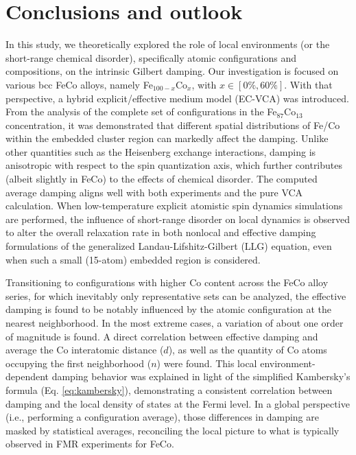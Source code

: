 \section{Conclusions and outlook}
\label{sec:conclusion}

In this study, we theoretically explored the role of local environments (or the short-range chemical disorder), specifically atomic configurations and compositions, on the intrinsic Gilbert damping. Our investigation is focused on various bcc FeCo alloys, namely Fe$_{100-x}$Co$_{x}$, with $x\in[0\%,60\%]$. With that perspective, a hybrid explicit/effective medium model (EC-VCA) was introduced. 
From the analysis of the complete set of configurations in the Fe$_{87}$Co$_{13}$ concentration, it was demonstrated that different spatial distributions of Fe/Co within the embedded cluster region can markedly affect the damping. Unlike other quantities such as the Heisenberg exchange interactions, damping is anisotropic with respect to the spin quantization axis, which further contributes (albeit slightly in FeCo) to the effects of chemical disorder. The computed average damping aligns well with both experiments and the pure VCA calculation. When low-temperature explicit atomistic spin dynamics simulations are performed, the influence of short-range disorder on local dynamics is observed to alter the overall relaxation rate in both nonlocal and effective damping formulations of the generalized Landau-Lifshitz-Gilbert (LLG) equation, even when such a small (15-atom) embedded region is considered.


Transitioning to configurations with higher Co content across the FeCo alloy series, for which inevitably only representative sets can be analyzed, the effective damping is found to be notably influenced by the atomic configuration at the nearest neighborhood. In the most extreme cases, a variation of about one order of magnitude is found. A direct correlation between effective damping and average the Co interatomic distance ($d$), as well as the quantity of Co atoms occupying the first neighborhood ($n$) were found. This local environment-dependent damping behavior was explained in light of the simplified Kambersky’s formula (Eq. \ref{eq:kambersky}), demonstrating a consistent correlation between damping and the local density of states at the Fermi level. In a global perspective (i.e., performing a configuration average), those differences in damping are masked by statistical averages, reconciling the local picture to what is typically observed in FMR experiments for FeCo.

